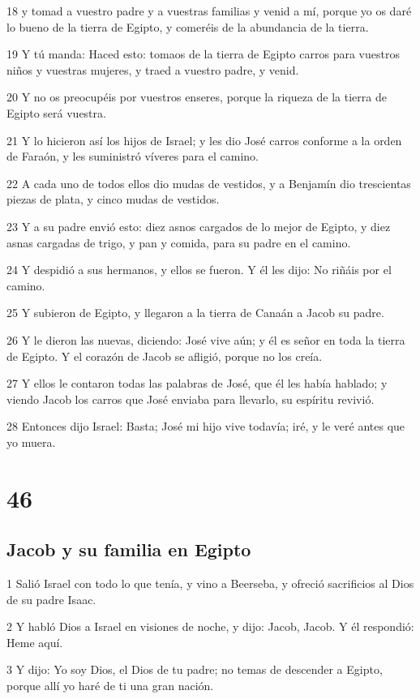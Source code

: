 18 y tomad a vuestro padre y a vuestras familias y venid a mí, porque yo os daré lo bueno de la tierra de Egipto, y comeréis de la abundancia de la tierra.

19 Y tú manda: Haced esto: tomaos de la tierra de Egipto carros para vuestros niños y vuestras mujeres, y traed a vuestro padre, y venid.

20 Y no os preocupéis por vuestros enseres, porque la riqueza de la tierra de Egipto será vuestra.

21 Y lo hicieron así los hijos de Israel; y les dio José carros conforme a la orden de Faraón, y les suministró víveres para el camino.

22 A cada uno de todos ellos dio mudas de vestidos, y a Benjamín dio trescientas piezas de plata, y cinco mudas de vestidos.

23 Y a su padre envió esto: diez asnos cargados de lo mejor de Egipto, y diez asnas cargadas de trigo, y pan y comida, para su padre en el camino.

24 Y despidió a sus hermanos, y ellos se fueron. Y él les dijo: No riñáis por el camino.

25 Y subieron de Egipto, y llegaron a la tierra de Canaán a Jacob su padre.

26 Y le dieron las nuevas, diciendo: José vive aún; y él es señor en toda la tierra de Egipto. Y el corazón de Jacob se afligió, porque no los creía.

27 Y ellos le contaron todas las palabras de José, que él les había hablado; y viendo Jacob los carros que José enviaba para llevarlo, su espíritu revivió.

28 Entonces dijo Israel: Basta; José mi hijo vive todavía; iré, y le veré antes que yo muera.

\chapter{46}

\section{Jacob y su familia en Egipto}

1 Salió Israel con todo lo que tenía, y vino a Beerseba, y ofreció sacrificios al Dios de su padre Isaac.

2 Y habló Dios a Israel en visiones de noche, y dijo: Jacob, Jacob. Y él respondió: Heme aquí.

3 Y dijo: Yo soy Dios, el Dios de tu padre; no temas de descender a Egipto, porque allí yo haré de ti una gran nación.

